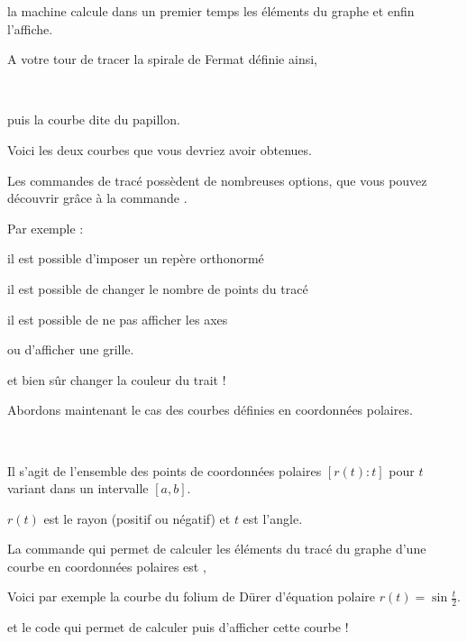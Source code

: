 la machine calcule dans un premier temps les éléments du graphe et enfin l'affiche.



\diapo

A votre tour de tracer la spirale de Fermat définie ainsi,%


~

puis la courbe dite du papillon.



\diapo

Voici les deux courbes que vous devriez avoir obtenues.

\change

Les commandes de tracé possèdent de nombreuses options, 
que vous pouvez découvrir grâce 
à la commande . 

\change
Par exemple :

il est possible d'imposer un repère orthonormé 

\change
il est possible de changer le nombre de points du tracé

\change
il est possible de ne pas afficher les axes
  
\change
ou d'afficher une grille.
 
\change
et bien sûr changer la couleur du trait !

\diapo

Abordons maintenant le cas des courbes définies en coordonnées polaires. 

~

Il s'agit de l'ensemble des points de coordonnées polaires $[r(t):t]$ pour $t$ variant dans un intervalle $[a,b]$.

$r(t)$ est le rayon (positif ou négatif) et $t$ est l'angle.

\change
La commande qui permet de calculer les éléments du tracé du graphe d'une courbe en coordonnées polaires est , 



\change
Voici par exemple la courbe du folium de Dürer d'équation polaire 
$r(t) = \sin \frac t 2$.

\change
et le code qui permet de calculer puis d'afficher cette courbe !


\diapo

